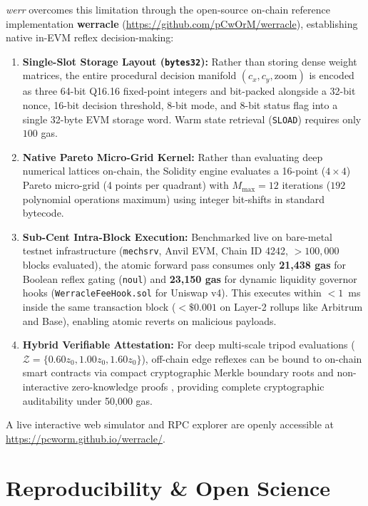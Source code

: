\documentclass[10pt,journal,compsoc,twocolumn]{article}
\begin{document}
\textit{werr} overcomes this limitation through the open-source on-chain reference implementation \textbf{werracle} (\url{https://github.com/pCwOrM/werracle}), establishing native in-EVM reflex decision-making:
\begin{enumerate}
    \item \textbf{Single-Slot Storage Layout (\texttt{bytes32}):} Rather than storing dense weight matrices, the entire procedural decision manifold $(c_x, c_y, \text{zoom})$ is encoded as three 64-bit Q16.16 fixed-point integers and bit-packed alongside a 32-bit nonce, 16-bit decision threshold, 8-bit mode, and 8-bit status flag into a single 32-byte EVM storage word. Warm state retrieval (\texttt{SLOAD}) requires only $100$ gas.
    \item \textbf{Native Pareto Micro-Grid Kernel:} Rather than evaluating deep numerical lattices on-chain, the Solidity engine evaluates a 16-point ($4 \times 4$) Pareto micro-grid (4 points per quadrant) with $M_{\max} = 12$ iterations ($192$ polynomial operations maximum) using integer bit-shifts in standard bytecode.
    \item \textbf{Sub-Cent Intra-Block Execution:} Benchmarked live on bare-metal testnet infrastructure (\texttt{mechsrv}, Anvil EVM, Chain ID 4242, $>100,000$ blocks evaluated), the atomic forward pass consumes only \textbf{21,438 gas} for Boolean reflex gating (\texttt{noul}) and \textbf{23,150 gas} for dynamic liquidity governor hooks (\texttt{WerracleFeeHook.sol} for Uniswap v4). This executes within $<1$~ms inside the same transaction block ($< \$0.001$ on Layer-2 rollups like Arbitrum and Base), enabling atomic reverts on malicious payloads.
    \item \textbf{Hybrid Verifiable Attestation:} For deep multi-scale tripod evaluations ($\mathcal{Z} = \{0.60 z_0, 1.00 z_0, 1.60 z_0\}$), off-chain edge reflexes can be bound to on-chain smart contracts via compact cryptographic Merkle boundary roots and non-interactive zero-knowledge proofs \cite{bensasson2014snarks}, providing complete cryptographic auditability under 50,000 gas.
\end{enumerate}
A live interactive web simulator and RPC explorer are openly accessible at \url{https://pcworm.github.io/werracle/}.

\section{Reproducibility \& Open Science}
\end{document}
